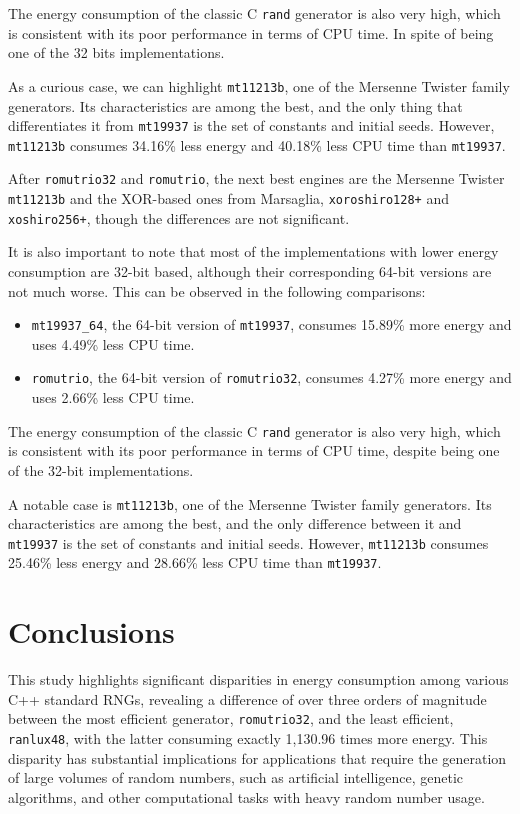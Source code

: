 \documentclass[sigconf]{acmart}
\begin{document}
The energy consumption of the classic C \texttt{rand} generator is also very high, which is consistent with its poor performance in terms of CPU time. In spite of being one of the 32 bits implementations.

As a curious case, we can highlight \texttt{mt11213b}, one of the Mersenne Twister family generators. Its characteristics are among the best, and the only thing that differentiates it from \texttt{mt19937} is the set of constants and initial seeds. However, \texttt{mt11213b} consumes 34.16\% less energy and 40.18\% less CPU time than \texttt{mt19937}.

After \texttt{romutrio32} and \texttt{romutrio}, the next best engines are the Mersenne Twister \texttt{mt11213b} and the XOR-based ones from Marsaglia, \texttt{xoroshiro128+} and \texttt{xoshiro256+}, though the differences are not significant.

It is also important to note that most of the implementations with lower energy consumption are 32-bit based, although their corresponding 64-bit versions are not much worse. This can be observed in the following comparisons:

\begin{itemize}
    \item \texttt{mt19937\_64}, the 64-bit version of \texttt{mt19937}, consumes 15.89\% more energy and uses 4.49\% less CPU time.
    \item \texttt{romutrio}, the 64-bit version of \texttt{romutrio32}, consumes 4.27\% more energy and uses 2.66\% less CPU time.
\end{itemize}

The energy consumption of the classic C \texttt{rand} generator is also very high, which is consistent with its poor performance in terms of CPU time, despite being one of the 32-bit implementations.

A notable case is \texttt{mt11213b}, one of the Mersenne Twister family generators. Its characteristics are among the best, and the only difference between it and \texttt{mt19937} is the set of constants and initial seeds. However, \texttt{mt11213b} consumes 25.46\% less energy and 28.66\% less CPU time than \texttt{mt19937}.


\section{Conclusions}
\label{sec:conclusions}

This study highlights significant disparities in energy consumption among various C++ standard RNGs, revealing a difference of over three orders of magnitude between the most efficient generator, \texttt{romutrio32}, and the least efficient, \texttt{ranlux48}, with the latter consuming exactly 1,130.96 times more energy. This disparity has substantial implications for applications that require the generation of large volumes of random numbers, such as artificial intelligence, genetic algorithms, and other computational tasks with heavy random number usage.
\end{document}
